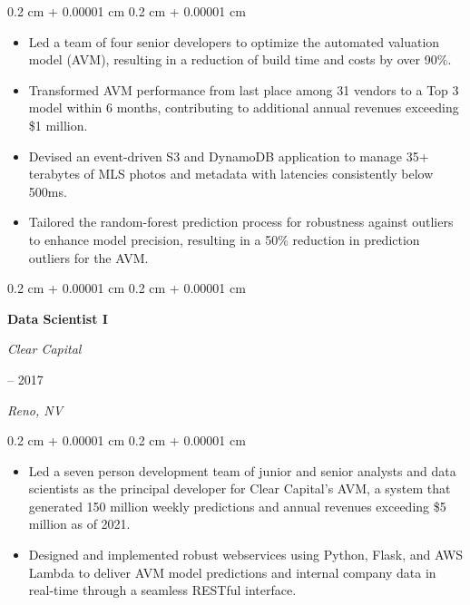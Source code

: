 \documentclass[11pt, letterpaper]{article}
\newenvironment{highlights}{
    \begin{itemize}[
        topsep=0.10 cm,
        parsep=0.10 cm,
        partopsep=0pt,
        itemsep=0pt,
        leftmargin=0.4 cm + 10pt
    ]
}{
    \end{itemize}
} %
\newenvironment{onecolentry}{
    \begin{adjustwidth}{
        0.2 cm + 0.00001 cm
    }{
        0.2 cm + 0.00001 cm
    }
}{
    \end{adjustwidth}
} %
\newenvironment{twocolentry}[2][]{
    \onecolentry
    \def\secondColumn{#2}
    \setcolumnwidth{\fill, 4.5 cm}
    \begin{paracol}{2}
}{
    \switchcolumn \raggedleft \secondColumn
    \end{paracol}
    \endonecolentry
} %
\begin{document}
\begin{onecolentry}
    \begin{highlights}

        \item Led a team of four senior developers to optimize the automated valuation
        model (AVM), resulting in a reduction of build time and costs by over 90\%.
        \item  Transformed AVM performance from last place among 31 vendors to a Top
        3 model within 6 months, contributing to additional annual revenues
        exceeding \$1 million.
        \item Devised an event-driven S3 and DynamoDB application to manage 35+ terabytes
        of MLS photos and metadata with latencies consistently below 500ms.
        \item Tailored the random-forest prediction process for robustness against outliers to
        enhance model precision, resulting in a 50\% reduction in prediction outliers for the AVM.

    \end{highlights}
\end{onecolentry}

\vspace{0.2 cm}
\begin{twocolentry}{
        2015 – 2017

        \textit{Reno, NV}
    }
    \textbf{Data Scientist I}

    \textit{Clear Capital}
\end{twocolentry}

\begin{onecolentry}
    \begin{highlights}

        \item Led a seven person development team of junior and senior analysts and data
        scientists as the principal developer for Clear Capital's AVM, a system that
        generated 150 million weekly predictions and annual revenues exceeding \$5
        million as of 2021.
        \item Designed and implemented robust webservices using Python, Flask, and
        AWS Lambda to deliver AVM model predictions and internal company data in
        real-time through a seamless RESTful interface.

    \end{highlights}
\end{onecolentry}
\end{document}
